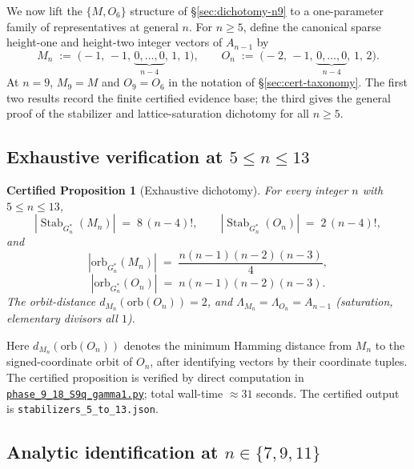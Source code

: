 \documentclass[11pt,a4paper]{article}
\newtheorem{certprop}[theorem]{Certified Proposition}
\theoremstyle{definition}
\theoremstyle{remark}
\providecommand{\Stab}{\operatorname{Stab}}
\begin{document}
We now lift the $\{M, O_6\}$ structure of \S\ref{sec:dichotomy-n9} to
a one-parameter family of representatives at general $n$. For
$n \ge 5$, define the canonical sparse height-one and height-two
integer vectors of $A_{n-1}$ by
\begin{equation*}
   M_n \;:=\; \bigl(-1,\, -1,\, \underbrace{0,\dots,0}_{n-4},\, 1,\, 1\bigr),
   \qquad
   O_n \;:=\; \bigl(-2,\, -1,\, \underbrace{0,\dots,0}_{n-4},\, 1,\, 2\bigr).
\end{equation*}
At $n = 9$, $M_9 = M$ and $O_9 = O_6$ in the notation of
\S\ref{sec:cert-taxonomy}. The first two results record the finite
certified evidence base; the third gives the general proof of the
stabilizer and lattice-saturation dichotomy for all $n \ge 5$.

\subsection{\texorpdfstring{Exhaustive verification at $5 \le n \le 13$}{Exhaustive verification at 5 <= n <= 13}}
\label{sec:dichotomy-exhaustive}

\begin{certprop}[Exhaustive dichotomy]
\label{prop:dichotomy-exhaustive}
For every integer $n$ with $5 \le n \le 13$,
\begin{equation*}
   |\Stab_{G^*_n}(M_n)| \;=\; 8 \,(n-4)!,
   \qquad
   |\Stab_{G^*_n}(O_n)| \;=\; 2 \,(n-4)!,
\end{equation*}
and
\begin{equation*}
   |\mathrm{orb}_{G^*_n}(M_n)| \;=\; \frac{n(n-1)(n-2)(n-3)}{4},
\end{equation*}
\begin{equation*}
   |\mathrm{orb}_{G^*_n}(O_n)| \;=\; n(n-1)(n-2)(n-3).
\end{equation*}
The orbit-distance $d_{M_n}(\mathrm{orb}(O_n)) = 2$, and
$\Lambda_{M_n} = \Lambda_{O_n} = A_{n-1}$ (saturation, elementary
divisors all $1$).
\end{certprop}

Here $d_{M_n}(\mathrm{orb}(O_n))$ denotes the minimum Hamming distance
from $M_n$ to the signed-coordinate orbit of $O_n$, after identifying
vectors by their coordinate tuples. The certified proposition is
verified by direct computation in
\href{../scripts/legacy/phase_9_18_S9q_gamma1.py}{\texttt{phase\_9\_18\_S9q\_gamma1.py}};
total wall-time $\approx 31$ seconds. The certified output is
\texttt{stabilizers\_5\_to\_13.json}.

\subsection{\texorpdfstring{Analytic identification at $n \in \{7, 9, 11\}$}{Analytic identification at n in {7,9,11}}}
\label{sec:dichotomy-analytic}
\end{document}
